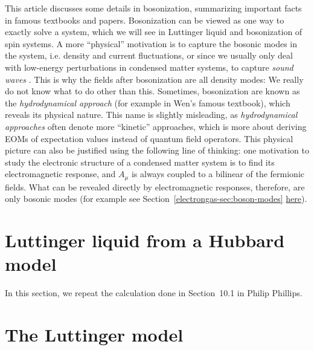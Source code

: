 \documentclass[hyperref, a4paper]{article}
\begin{document}
This article discusses some details in bosonization, summarizing important facts in famous textbooks and papers.
Bosonization can be viewed as one way to exactly solve a system, which we will see in Luttinger liquid and
bosonization of spin systems. A more ``physical'' motivation is to capture the bosonic modes in the system,
i.e. density and current fluctuations, or since we usually only deal with low-energy perturbations in 
condensed matter systems, to capture \emph{sound waves} \cite{Tomonaga1950RemarksOB,10.1143/PTPS.170.185}. 
This is why the fields after bosonization are all density modes: We really do not know what to do other than
this. Sometimes, bosonization are known as the \emph{hydrodynamical approach} (for example in Wen's famous 
textbook), which reveals its physical nature. This name is slightly misleading, as \emph{hydrodynamical approaches}
often denote more ``kinetic'' approaches, which is more about deriving EOMs of expectation values instead of 
quantum field operators. This physical picture can also be justified using the following line of thinking: 
one motivation to study the electronic structure of a condensed matter system is to find its electromagnetic 
response, and $A_\mu$ is always coupled to a bilinear of the fermionic fields. What can be revealed directly 
by electromagnetic responses, therefore, are only bosonic modes (for example see Section~\ref{electrongas-sec:boson-modes} \href{../band-metal-insulator/electron-gas.pdf}{here}).

\section{Luttinger liquid from a Hubbard model}

In this section, we repeat the calculation done in Section~10.1 in Philip Phillips. 


\section{The Luttinger model}


 
\end{document}
